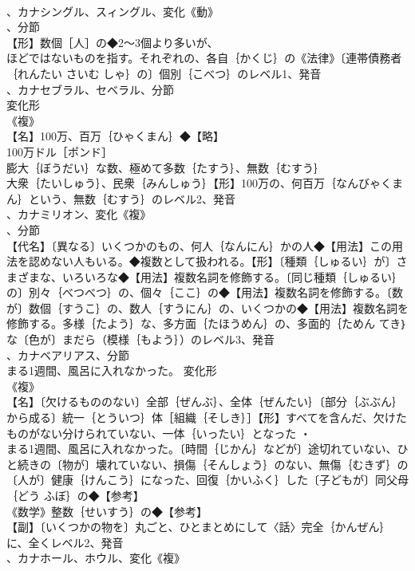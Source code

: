 \documentclass[8pt]{extreport}
\begin{document}
\begin{CJK}{UTF8}{min}
\\	、カナシングル、スィングル、変化《動》
\\	、分節
\\	【形】数個［人］の◆2～3個より多いが、
\\	ほどではないものを指す。それぞれの、各自｛かくじ｝の《法律》〔連帯債務者｛れんたい さいむ しゃ｝の〕個別｛こべつ｝のレベル1、発音
\\	、カナセブラル、セベラル、分節
\\	変化形 
\\	《複》
\\	【名】100万、百万｛ひゃくまん｝◆【略】
\\	100万ドル［ポンド］
\\	膨大｛ぼうだい｝な数、極めて多数｛たすう｝、無数｛むすう｝
\\	大衆｛たいしゅう｝、民衆｛みんしゅう｝【形】100万の、何百万｛なんびゃくまん｝という、無数｛むすう｝のレベル2、発音
\\	、カナミリオン、変化《複》
\\	、分節
\\	【代名】〔異なる〕いくつかのもの、何人｛なんにん｝かの人◆【用法】この用法を認めない人もいる。◆複数として扱われる。【形】〔種類｛しゅるい｝が〕さまざまな、いろいろな◆【用法】複数名詞を修飾する。〔同じ種類｛しゅるい｝の〕別々｛べつべつ｝の、個々｛ここ｝の◆【用法】複数名詞を修飾する。〔数が〕数個｛すうこ｝の、数人｛すうにん｝の、いくつかの◆【用法】複数名詞を修飾する。多様｛たよう｝な、多方面｛たほうめん｝の、多面的｛ためん てき｝な〔色が〕まだら（模様｛もよう｝）のレベル3、発音
\\	、カナベアリアス、分節
\\	まる1週間、風呂に入れなかった。	変化形 
\\	《複》
\\	【名】〔欠けるもののない〕全部｛ぜんぶ｝、全体｛ぜんたい｝〔部分｛ぶぶん｝から成る〕統一｛とういつ｝体［組織｛そしき｝］【形】すべてを含んだ、欠けたものがない分けられていない、一体｛いったい｝となった ・
\\	まる1週間、風呂に入れなかった。〔時間｛じかん｝などが〕途切れていない、ひと続きの〔物が〕壊れていない、損傷｛そんしょう｝のない、無傷｛むきず｝の〔人が〕健康｛けんこう｝になった、回復｛かいふく｝した〔子どもが〕同父母｛どう ふぼ｝の◆【参考】
\\	《数学》整数｛せいすう｝の◆【参考】
\\	【副】〔いくつかの物を〕丸ごと、ひとまとめにして〈話〉完全｛かんぜん｝に、全くレベル2、発音
\\	、カナホール、ホウル、変化《複》

\end{CJK}
\end{document}
